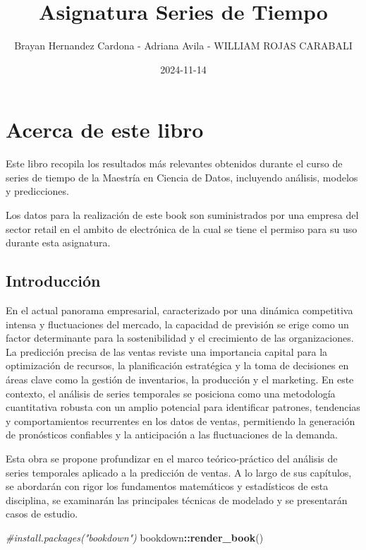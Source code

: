 \documentclass[
]{book}
\title{Asignatura Series de Tiempo}
\author{Brayan Hernandez Cardona - Adriana Avila - WILLIAM ROJAS CARABALI}
\date{2024-11-14}
\newenvironment{Shaded}{\begin{snugshade}}{\end{snugshade}}
\newcommand{\CommentTok}[1]{\textcolor[rgb]{0.56,0.35,0.01}{\textit{#1}}}
\newcommand{\FunctionTok}[1]{\textcolor[rgb]{0.13,0.29,0.53}{\textbf{#1}}}
\newcommand{\NormalTok}[1]{#1}
\newcommand{\SpecialCharTok}[1]{\textcolor[rgb]{0.81,0.36,0.00}{\textbf{#1}}}
\begin{document}
\maketitle

{
\setcounter{tocdepth}{1}
\tableofcontents
}
\chapter{Acerca de este libro}\label{acerca-de-este-libro}

Este libro recopila los resultados más relevantes obtenidos durante el curso de series de tiempo de la Maestría en Ciencia de Datos, incluyendo análisis, modelos y predicciones.

Los datos para la realización de este book son suministrados por una empresa del sector retail en el ambito de electrónica de la cual se tiene el permiso para su uso durante esta asignatura.

\section{Introducción}\label{introducciuxf3n}

En el actual panorama empresarial, caracterizado por una dinámica competitiva intensa y fluctuaciones del mercado, la capacidad de previsión se erige como un factor determinante para la sostenibilidad y el crecimiento de las organizaciones. La predicción precisa de las ventas reviste una importancia capital para la optimización de recursos, la planificación estratégica y la toma de decisiones en áreas clave como la gestión de inventarios, la producción y el marketing. En este contexto, el análisis de series temporales se posiciona como una metodología cuantitativa robusta con un amplio potencial para identificar patrones, tendencias y comportamientos recurrentes en los datos de ventas, permitiendo la generación de pronósticos confiables y la anticipación a las fluctuaciones de la demanda.

Esta obra se propone profundizar en el marco teórico-práctico del análisis de series temporales aplicado a la predicción de ventas. A lo largo de sus capítulos, se abordarán con rigor los fundamentos matemáticos y estadísticos de esta disciplina, se examinarán las principales técnicas de modelado y se presentarán casos de estudio.

\begin{Shaded}
\begin{Highlighting}[]
\CommentTok{\#install.packages("bookdown")}
\NormalTok{bookdown}\SpecialCharTok{::}\FunctionTok{render\_book}\NormalTok{()}
\end{Highlighting}
\end{Shaded}
\end{document}

